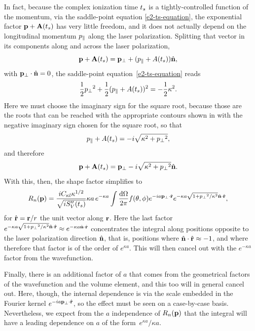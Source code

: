 In fact, because the complex ionization time ${t_s}$ is a tightly-controlled function of the momentum, via the saddle-point equation \eqref{e2-ts-equation}, the exponential factor $\vb{p}+\vb{A}({t_s})$ has very little freedom, and it does not actually depend on the longitudinal momentum ${p_{\parallel}}$ along the laser polarization. Splitting that vector in its components along and across the laser polarization,
\begin{equation}
\vb{p}+\vb{A}({t_s}) = {\vb{p}_{\perp}} + ({p_{\parallel}} + A({t_s}))\hat{\vb{n}},
\end{equation}
with ${\vb{p}_{\perp}}\cdot\hat{\vb{n}}=0$, the saddle-point equation~\eqref{e2-ts-equation} reads
\begin{equation}
\frac 12 {p_{\perp}}^2 + \frac12 ({p_{\parallel}} + A({t_s}))^2 = - \frac12 \kappa^2.
\end{equation}
Here we must choose the imaginary sign for the square root, because those are the roots that can be reached with the appropriate contours shown in 
with the negative imaginary sign chosen for the square root, so that 
\begin{equation}
{p_{\parallel}} + A({t_s}) = -i \sqrt{\kappa^2 + {p_{\perp}}^2},
\end{equation}
and therefore
\begin{equation}
\vb{p}+\vb{A}({t_s}) = {\vb{p}_{\perp}} -i \sqrt{\kappa^2 + {p_{\perp}}^2} \hat{\vb{n}}.
\end{equation}
With this, then, the shape factor simplifies to
\begin{equation}
R_n(\vb{p})
=
\frac{ iC_{\kappa l} \kappa^{1/2} }{\sqrt{iS_V''({t_s})}}
\kappa a \, e^{-\kappa a}
\int\frac{\mathrm{d}\Omega}{2\pi}
f(\theta,\phi)
e^{-i a{\vb{p}_{\perp}} \cdot\hat{\vb{r}} } 
e^{-\kappa a\sqrt{1 + {p_{\perp}}^2/\kappa^2} \hat{\vb{n}} \cdot\hat{\vb{r}} } 
,
\label{e2-shape-factor-second-stab}
\end{equation}
for $\hat{\vb{r}}=\vb{r}/r$ the unit vector along $\vb{r}$. Here the last factor $e^{-\kappa a\sqrt{1 + {p_{\perp}}^2/\kappa^2} \hat{\vb{n}} \cdot\hat{\vb{r}} } \approx e^{-\kappa a \hat{\vb{n}} \cdot\hat{\vb{r}} }$ concentrates the integral along positions opposite to the laser polarization direction $\hat{\vb{n}}$, that is, positions where $\hat{\vb{n}}\cdot\hat{\vb{r}} \approx -1$, and where therefore that factor is of the order of $e^{\kappa a}$. This will then cancel out with the $e^{-\kappa a}$ factor from the wavefunction.

Finally, there is an additional factor of $a$ that comes from the geometrical factors of the wavefunction and the volume element, and this too will in general cancel out. Here, though, the internal dependence is via the scale embedded in the Fourier kernel $e^{-i a{\vb{p}_{\perp}} \cdot\hat{\vb{r}} }$, so the effect must be seen on a case-by-case basis. Nevertheless, we expect from the $a$ independence of $R_n(\vb{p})$ that the integral will have a leading dependence on $a$ of the form~$e^{\kappa a}/\kappa a$.

